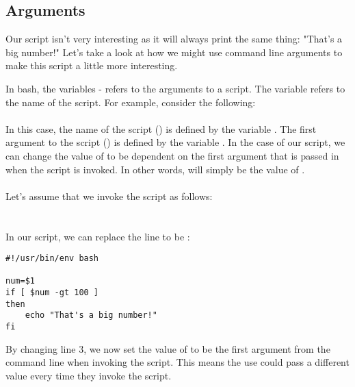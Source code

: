 \documentclass{article}
\begin{document}
\subsection{Arguments}
Our  script isn't very interesting as it will always print the same thing: "That's a big number!" Let's take a look at how we might use command line arguments to make this script a little more interesting.
\par
In bash, the variables  -  refers to the arguments to a script.
The variable  refers to the name of the script. For example, consider the following:
\\
\\
In this case, the name of the script () is defined by the variable . The first argument to the script () is defined by the variable . In the case of our  script, we can change the value of  to be dependent on the first argument that is passed in when the script is invoked. In other words,  will simply be the value of . 
\\
\\Let's assume that we invoke the script as follows: 
\\
\\ 
\\
In our script, we can replace the line  to be :
\begin{lstlisting}[style=Python]
#!/usr/bin/env bash

num=$1
if [ $num -gt 100 ]
then
	echo "That's a big number!"
fi
\end{lstlisting}
By changing line 3, we now set the value of  to be the first argument from the command line when invoking the script. This means the use could pass a different value every time they invoke the script.
\par
\end{document}
